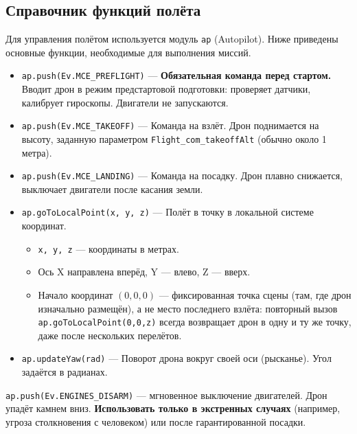 \subsection{Справочник функций полёта}

Для управления полётом используется модуль \texttt{ap} (Autopilot). Ниже приведены основные функции, необходимые для выполнения миссий.

\begin{infobox}
\begin{itemize}
   \item \texttt{ap.push(Ev.MCE\_PREFLIGHT)} — \textbf{Обязательная команда перед стартом.} Вводит дрон в режим предстартовой подготовки: проверяет датчики, калибрует гироскопы. Двигатели не запускаются.
   
   \item \texttt{ap.push(Ev.MCE\_TAKEOFF)} — Команда на взлёт. Дрон поднимается на высоту, заданную параметром \texttt{Flight\_com\_takeoffAlt} (обычно около 1 метра).
   
   \item \texttt{ap.push(Ev.MCE\_LANDING)} — Команда на посадку. Дрон плавно снижается, выключает двигатели после касания земли.
   
   \item \texttt{ap.goToLocalPoint(x, y, z)} — Полёт в точку в локальной системе координат.
   \begin{itemize}
       \item \texttt{x, y, z} — координаты в метрах.
       \item Ось X направлена вперёд, Y — влево, Z — вверх.
       \item Начало координат \((0,0,0)\) — фиксированная точка сцены (там, где дрон изначально размещён), а не место последнего взлёта: повторный вызов \texttt{ap.goToLocalPoint(0,0,z)} всегда возвращает дрон в одну и ту же точку, даже после нескольких перелётов.
   \end{itemize}
   
   \item \texttt{ap.updateYaw(rad)} — Поворот дрона вокруг своей оси (рысканье). Угол задаётся в радианах.
\end{itemize}
\end{infobox}

\begin{warnbox}
\texttt{ap.push(Ev.ENGINES\_DISARM)} — мгновенное выключение двигателей. Дрон упадёт камнем вниз.
\textbf{Использовать только в экстренных случаях} (например, угроза столкновения с человеком) или после гарантированной посадки.
\end{warnbox}

